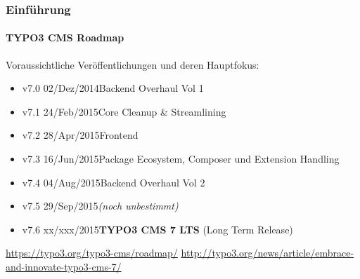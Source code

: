 \begin{frame}[fragile]
	\frametitle{Einführung}
	\framesubtitle{TYPO3 CMS Roadmap}

	Voraussichtliche Veröffentlichungen und deren Hauptfokus:

	\begin{itemize}
		\item v7.0 \tabto{1.0cm}02/Dez/2014\tabto{3.4cm}Backend Overhaul Vol 1
		\item v7.1 \tabto{1.0cm}24/Feb/2015\tabto{3.4cm}Core Cleanup \& Streamlining
		\item v7.2 \tabto{1.0cm}28/Apr/2015\tabto{3.4cm}Frontend

		\item
			\begingroup
				\color{typo3orange}
					v7.3 \tabto{1.0cm}16/Jun/2015\tabto{3.4cm}Package Ecosystem, Composer\newline
					\tabto{3.4cm}und Extension Handling
			\endgroup

		\item v7.4 \tabto{1.0cm}04/Aug/2015\tabto{3.4cm}Backend Overhaul Vol 2
		\item v7.5 \tabto{1.0cm}29/Sep/2015\tabto{3.4cm}\textit{(noch unbestimmt)}
		\item v7.6 \tabto{1.0cm}xx/xxx/2015\tabto{3.4cm}\textbf{TYPO3 CMS 7 LTS} (Long Term Release)
	\end{itemize}

	\smaller
		\url{https://typo3.org/typo3-cms/roadmap/}\newline
		\url{http://typo3.org/news/article/embrace-and-innovate-typo3-cms-7/}
	\normalsize

\end{frame}

